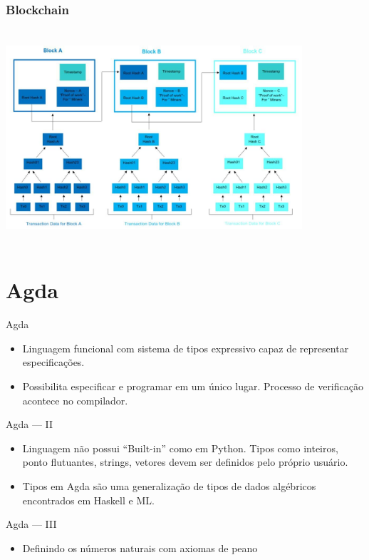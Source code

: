\documentclass{beamer}
\begin{document}
\begin{frame}
\frametitle{Blockchain}
\includegraphics[width=11cm, height=8cm]{blockchain3}
\end{frame}
 
\section{Agda}

 \begin{frame}{Agda}
 \begin{itemize}
     \item Linguagem funcional com sistema de tipos expressivo capaz de representar especificações.
     \item Possibilita especificar e programar em um único lugar. Processo de verificação acontece no compilador.
 \end{itemize}
 \end{frame}
 
 \begin{frame}{Agda --- II}
 \begin{itemize}
     \item Linguagem não possui \foreignquote{english}{Built-in} como em Python. Tipos como inteiros, ponto flutuantes, strings, vetores devem ser definidos pelo próprio usuário.
     \item Tipos em Agda são uma generalização de tipos de dados algébricos encontrados em Haskell e ML.
 \end{itemize}
 \end{frame}
 
 \begin{frame}{Agda --- III}
\begin{itemize}
	\item Definindo os números naturais com axiomas de peano
 \end{itemize}
\end{frame}
\end{document}

